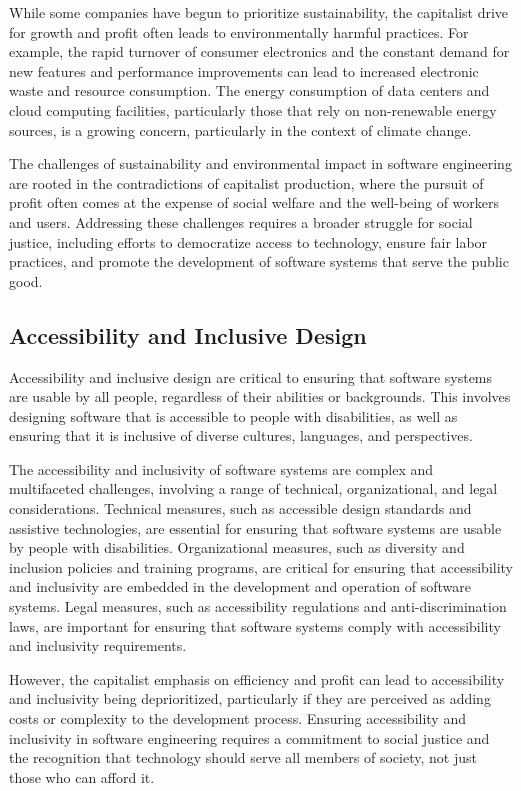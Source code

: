 \begin{refsection}
\begin{multicols}{2}
{While some companies have begun to prioritize sustainability, the capitalist drive for growth and profit often leads to environmentally harmful practices. For example, the rapid turnover of consumer electronics and the constant demand for new features and performance improvements can lead to increased electronic waste and resource consumption. The energy consumption of data centers and cloud computing facilities, particularly those that rely on non-renewable energy sources, is a growing concern, particularly in the context of climate change.

The challenges of sustainability and environmental impact in software engineering are rooted in the contradictions of capitalist production, where the pursuit of profit often comes at the expense of social welfare and the well-being of workers and users. Addressing these challenges requires a broader struggle for social justice, including efforts to democratize access to technology, ensure fair labor practices, and promote the development of software systems that serve the public good.

\subsection{Accessibility and Inclusive Design}

Accessibility and inclusive design are critical to ensuring that software systems are usable by all people, regardless of their abilities or backgrounds. This involves designing software that is accessible to people with disabilities, as well as ensuring that it is inclusive of diverse cultures, languages, and perspectives.

The accessibility and inclusivity of software systems are complex and multifaceted challenges, involving a range of technical, organizational, and legal considerations. Technical measures, such as accessible design standards and assistive technologies, are essential for ensuring that software systems are usable by people with disabilities. Organizational measures, such as diversity and inclusion policies and training programs, are critical for ensuring that accessibility and inclusivity are embedded in the development and operation of software systems. Legal measures, such as accessibility regulations and anti-discrimination laws, are important for ensuring that software systems comply with accessibility and inclusivity requirements.

However, the capitalist emphasis on efficiency and profit can lead to accessibility and inclusivity being deprioritized, particularly if they are perceived as adding costs or complexity to the development process. Ensuring accessibility and inclusivity in software engineering requires a commitment to social justice and the recognition that technology should serve all members of society, not just those who can afford it.

}
\end{multicols}
\end{refsection}
